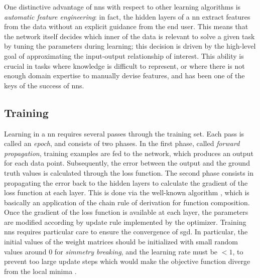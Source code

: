 One distinctive advantage of \glspl{nn} with respect to other learning algorithms is \emph{automatic feature engineering}: in fact, the hidden layers of a \gls{nn} extract features from the data without an explicit guidance from the end user. This means that the network itself decides which inner  of the data is relevant to solve a given task by tuning the parameters during learning; this decision is driven by the high-level goal of approximating the input-output relationship of interest. This ability is crucial in tasks where knowledge is difficult to represent, or where there is not enough domain expertise to manually devise features, and has been one of the keys of the success of \glspl{nn}.

\subsection{Training}\label{sec:training}
Learning in a \gls{nn} requires several passes through the training set. Each pass is called an \emph{epoch}, and consists of two phases. In the first phase, called \emph{forward propagation}, training examples are fed to the network, which produces an output for each data point. Subsequently, the error between the output and the ground truth values is calculated through the loss function. The second phase consists in propagating the error back to the hidden layers to calculate the gradient of the loss function at each layer. This is done via the well-known  algorithm \citep{rumelhart1986backprop}, which is basically an application of the chain rule of derivation for function composition. Once the gradient of the loss function is available at each layer, the parameters are modified according by update rule implemented by the optimizer. Training \glspl{nn} requires particular care to ensure the convergence of \gls{sgd}. In particular, the initial values of the weight matrices should be initialized with small random values around 0 for \emph{simmetry breaking}, and the learning rate must be $< 1$, to prevent too large update steps which would make the objective function diverge from the local minima \citep{lecun1998backprop}.


